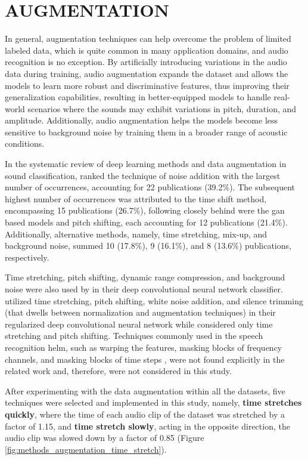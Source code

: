 \section{AUGMENTATION}
\label{sec:methods_augmentation}

In general, augmentation techniques can help overcome the problem of limited labeled data, which is quite common in many application domains, and audio recognition is no exception. By artificially introducing variations in the audio data during training, audio augmentation expands the dataset and allows the models to learn more robust and discriminative features, thus improving their generalization capabilities, resulting in better-equipped models to handle real-world scenarios where the sounds may exhibit variations in pitch, duration, and amplitude. Additionally, audio augmentation helps the models become less sensitive to background noise by training them in a broader range of acoustic conditions.

In the systematic review of deep learning methods and data augmentation in sound classification, \textcite{Alli2022} ranked the technique of noise addition with the largest number of occurrences, accounting for 22 publications (39.2\%). The subsequent highest number of occurrences was attributed to the time shift method, encompassing 15 publications (26.7\%), following closely behind were the \gls{gan} based models and pitch shifting, each accounting for 12 publications (21.4\%). Additionally, alternative methods, namely, time stretching, mix-up, and background noise, summed 10 (17.8\%), 9 (16.1\%), and 8 (13.6\%) publications, respectively. 

 Time stretching, pitch shifting, dynamic range compression, and background noise were also used by \textcite{Salamon2017} in their deep convolutional neural network classifier. \textcite{Mushtaq2020b} utilized time stretching, pitch shifting, white noise addition, and silence trimming (that dwells between normalization and augmentation techniques) in their regularized deep convolutional neural network while \textcite{Bountourakis2019} considered only time stretching and pitch shifting. Techniques commonly used in the speech recognition helm, such as warping the features, masking blocks of frequency channels, and masking blocks of time steps \cite{Park2019}, were not found explicitly in the related work and, therefore, were not considered in this study.

After experimenting with the data augmentation within all the datasets, five techniques were selected and implemented in this study, namely, \textbf{time stretches quickly}, where the time of each audio clip of the dataset was stretched by a factor of 1.15, and \textbf{time stretch slowly}, acting in the opposite direction, the audio clip was slowed down by a factor of 0.85 (Figure \ref{fig:methods_augmentation_time_stretch}).

